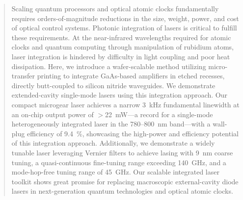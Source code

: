 \documentclass[%
 reprint,
 amsmath,amssymb,
 aps,
]{revtex4-2}
\begin{document}
\begin{abstract}
Scaling quantum processors and optical atomic clocks fundamentally requires orders-of-magnitude reductions in the size, weight, power, and cost of optical control systems. Photonic integration of lasers is critical to fulfill these requirements. At the near-infrared wavelengths required for atomic clocks and quantum computing through manipulation of rubidium atoms, laser integration is hindered by difficulty in light coupling and poor heat dissipation. Here, we introduce a wafer-scalable method utilizing micro-transfer printing to integrate GaAs-based amplifiers in etched recesses, directly butt-coupled to silicon nitride waveguides. We demonstrate extended-cavity single-mode lasers using this integration approach. Our compact microgear laser achieves a narrow 3~kHz fundamental linewidth at an on-chip output power of $>$22~mW---a record for a single-mode heterogeneously integrated laser in the 780--800~nm band---with a wall-plug efficiency of 9.4~\%, showcasing the high-power and efficiency potential of this integration approach. Additionally, we demonstrate a widely tunable laser leveraging Vernier filters to achieve lasing with 9~nm coarse tuning, a quasi-continuous fine-tuning range exceeding 140~GHz, and a mode-hop-free tuning range of 45~GHz. Our scalable integrated laser toolkit shows great promise for replacing macroscopic external-cavity diode lasers in next-generation quantum technologies and optical atomic clocks.

\end{abstract}
\maketitle




\mbox{}
\clearpage
\newpage
\end{document}
